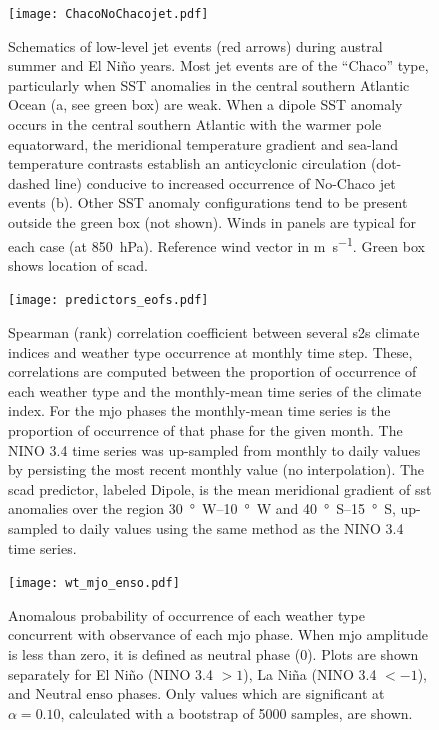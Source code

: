 \documentclass{ametsoc}
\begin{document}
\begin{figure}
	\noindent\texttt{[image: ChacoNoChacojet.pdf]}
	\caption{
		Schematics of low-level jet events (red arrows) during austral summer and El Ni\~no years.
		Most jet events are of the ``Chaco'' type, particularly when SST anomalies in the central southern Atlantic Ocean (a, see green box) are weak.
		When a dipole SST anomaly occurs in the central southern Atlantic with the warmer pole equatorward, the meridional temperature gradient and sea-land temperature contrasts establish an anticyclonic circulation (dot-dashed line) conducive to increased occurrence of No-Chaco jet events (b).
		Other SST anomaly configurations tend to be present outside the green box (not shown).
		Winds in panels are typical for each case (at \SI{850}{\hecto\pascal}).
		Reference wind vector in \si{\meter\per\second}.
		Green box shows location of \gls{scad}.
	}\label{fig:chaco-nochaco}
\end{figure}

\begin{figure}
	\texttt{[image: predictors\_eofs.pdf]}
	\caption{
		Spearman (rank) correlation coefficient between several \gls{s2s} climate indices and weather type occurrence at monthly time step.
		These, correlations are computed between the proportion of occurrence of each weather type and the monthly-mean time series of the climate index.
		For the \gls{mjo} phases the monthly-mean time series is the proportion of occurrence of that phase for the given month.
		The NINO 3.4 time series was up-sampled from monthly to daily values by persisting the most recent monthly value (no interpolation).
		The \acrfull{scad} predictor, labeled Dipole, is the mean meridional gradient of \gls{sst} anomalies over the region \SIrange{30}{10}{\degree W} and \SIrange{40}{15}{\degree S}, up-sampled to daily values using the same method as the NINO 3.4 time series.
	}\label{fig:predictor-eof}
\end{figure}

\begin{figure}
	\texttt{[image: wt\_mjo\_enso.pdf]}
	\caption{
		Anomalous probability of occurrence of each weather type concurrent with observance of each \gls{mjo} phase. 
		When \gls{mjo} amplitude is less than zero, it is defined as neutral phase (0).
		Plots are shown separately for El Ni\~no (NINO 3.4 $>1$), La Ni\~na (NINO 3.4 $< -1$), and Neutral \gls{enso} phases.
		Only values which are significant at $\alpha=0.10$, calculated with a bootstrap of 5000 samples, are shown.
	}\label{fig:wt-mjo-enso}
\end{figure}
\end{document}
